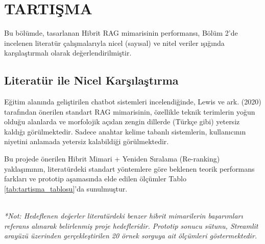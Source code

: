 \documentclass[12pt,a4paper]{report}
\begin{document}
\chapter{TARTIŞMA}

Bu bölümde, tasarlanan Hibrit RAG mimarisinin performansı, Bölüm 2'de incelenen literatür çalışmalarıyla nicel (sayısal) ve nitel veriler ışığında karşılaştırmalı olarak değerlendirilmiştir.

\section{Literatür ile Nicel Karşılaştırma}
Eğitim alanında geliştirilen chatbot sistemleri incelendiğinde, Lewis ve ark. (2020) tarafından önerilen standart RAG mimarisinin, özellikle teknik terimlerin yoğun olduğu alanlarda ve morfolojik açıdan zengin dillerde (Türkçe gibi) yetersiz kaldığı görülmektedir. Sadece anahtar kelime tabanlı sistemlerin, kullanıcının niyetini anlamada yetersiz kalabildiği görülmektedir.

Bu projede önerilen Hibrit Mimari + Yeniden Sıralama (Re-ranking) yaklaşımının, literatürdeki standart yöntemlere göre beklenen teorik performans farkları ve prototip aşamasında elde edilen ölçümler Tablo \ref{tab:tartisma_tablosu}'da sunulmuştur.


\begin{table}[H]
\centering
\caption{Önerilen Sistemin Literatürdeki Yöntemlerle Karşılaştırmalı Analizi ve Prototip Sonuçları}
\label{tab:tartisma_tablosu}
\vspace{0.2cm} \\
\footnotesize{\textit{*Not: Hedeflenen değerler literatürdeki benzer hibrit mimarilerin başarımları referans alınarak belirlenmiş proje hedefleridir. Prototip sonucu sütunu, Streamlit arayüzü üzerinden gerçekleştirilen 20 örnek sorguya ait ölçümleri göstermektedir.}}
\end{table}
\end{document}
